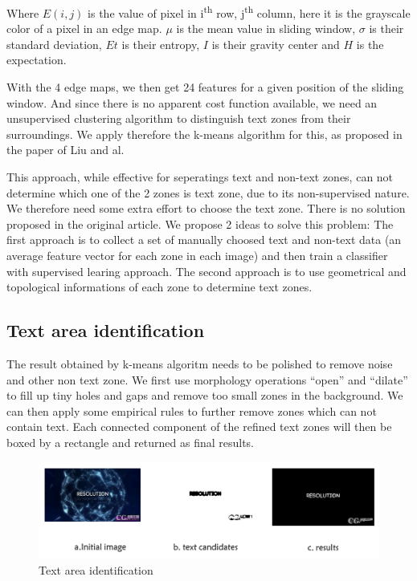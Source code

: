 \documentclass[paper=a4, french, 11pt]{scrartcl}
\begin{document}
Where $E(i,j)$ is the value of pixel in i\textsuperscript{th} row, j\textsuperscript{th} column, here it is the grayscale color of a pixel in an edge map. $\mu$ is the mean value in sliding window, $\sigma$ is their standard deviation, $ Et$ is their entropy, $ I$  is their gravity center and $ H$ is the expectation.

With the 4 edge maps, we then get 24 features for a given position of the sliding window. And since there is no apparent cost function available, we need an unsupervised clustering algorithm to distinguish text zones from their surroundings. We apply therefore the k-means algorithm for this, as proposed in the paper of Liu and al.

This approach, while effective for seperatings text and non-text zones, can not determine which one of the 2 zones is text zone, due to its non-supervised nature. We therefore need some extra effort to choose the text zone. There is no solution proposed in the original article. We propose 2 ideas to solve this problem: The first approach is to collect a set of manually choosed text and non-text data (an average feature vector for each zone in each image) and then train a classifier with supervised learing approach. The second approach is to use geometrical and topological informations of each zone to determine text zones.

\subsection{Text area identification}
The result obtained by k-means algoritm needs to be polished to remove noise and other non text zone. We first use morphology operations “open” and “dilate” to fill up tiny holes and gaps and remove too small zones in the background. We can then apply some empirical rules to further remove zones which can not contain text. Each connected component of the refined text zones will then be boxed by a rectangle and returned as final results.

\begin{figure}[h]
\begin{center}
   \includegraphics[width=0.9\linewidth]{text_area_example.png}
\end{center}
\vspace{-4ex}
\caption{Text area identification}
\label{fig:heatmap}
\end{figure}
\end{document}
